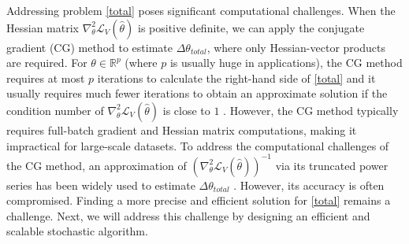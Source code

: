 Addressing problem \eqref{total} poses significant computational challenges. When the Hessian matrix $\nabla_{\theta}^2\mathcal{L}_{V}(\hat{\theta})$ is positive definite, we can apply the conjugate gradient (CG) method to estimate $\Delta \theta_{total}$, where only Hessian-vector products are required. For $\theta \in \mathbb{R}^p$ (where $p$ is usually huge in applications), the CG method requires at most $p$ iterations to calculate the right-hand side of \eqref{total} and it usually requires much fewer iterations to obtain an approximate solution if the condition number of $\nabla_{\theta}^2\mathcal{L}_{V}(\hat{\theta})$ is close to $1$ \cite{nocedal1999numerical}. However, the CG method typically requires full-batch gradient and Hessian matrix computations, making it impractical for large-scale datasets. To address the computational challenges of the CG method, an approximation of $\left(\nabla^2_{\theta}\mathcal{L}_V(\hat{\theta})\right)^{-1}$ via its truncated power series has been widely used to estimate $\Delta\theta_{total}$ \cite{koh2017understanding}. However, its accuracy is often compromised. Finding a more precise and efficient solution for \eqref{total} remains a challenge. Next, we will address this challenge by designing an efficient and scalable stochastic algorithm.

